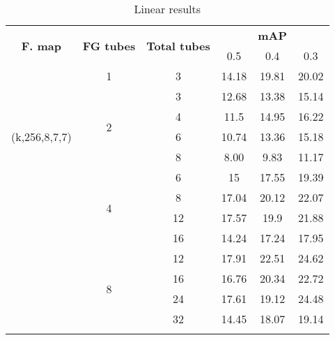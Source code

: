 \begin{center}
  \begin{longtable}{|| c | c | c || c c c||}
    \hline
    \multirow{2}{*}{\textbf{F. map}} & \multirow{2}{*}{\textbf{FG tubes}} & \multirow{2}{*}{\textbf{Total tubes}} & {} & \textbf{mAP} & {} \\
    {}  & {} & {} & 0.5 & 0.4 & 0.3 \\
    \hline
    \multirow{7}{*}{(k,256,8,7,7)}  & 1 & 3& 14.18 &19.81 & 20.02 \\
    \cline{2-6}
    {} & \multirow{4}{*}{2} & 3 & 12.68 & 13.38 & 15.14 \\
    \cline{3-6}
    {} & {} & 4 & 11.5 & 14.95 & 16.22 \\
    \cline{3-6}
    {} & {} & 6 & 10.74 & 13.36 & 15.18 \\
    \cline{3-6}
    {} & {} & 8 & 8.00 & 9.83 & 11.17 \\
    \cline{2-6}
    {} & \multirow{4}{*}{4} & 6 & 15 & 17.55 & 19.39 \\
    \cline{3-6}
    {} & {} & 8 & 17.04	& 20.12 &22.07 \\
    \cline{3-6}
    {} & {} & 12 & 17.57 & 19.9 & 21.88 \\
    \cline{3-6}
    {} & {} & 16 & 14.24 & 17.24 & 17.95 \\

    \cline{2-6}
    {} & \multirow{4}{*}{8} & 12 & 17.91 & 22.51 & 24.62 \\
    \cline{3-6}
    {} & {} & 16 & 16.76 & 20.34 & 22.72 \\
    \cline{3-6}
    {} & {} & 24 & 17.61 & 19.12 & 24.48 \\
    \cline{3-6}
    {} & {} & 32 & 14.45 & 18.07 & 19.14  \\
    \hline

    \caption{Linear results }
    \label{table:linear_increased}
  \end{longtable}
\end{center}

